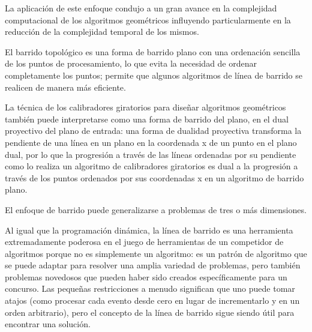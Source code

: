 La aplicación de este enfoque condujo a un gran avance en la complejidad computacional de los algoritmos geométricos influyendo particularmente en la reducción de la complejidad temporal de los mismos.

El barrido topológico es una forma de barrido plano con una ordenación sencilla de los puntos de procesamiento, lo que evita la necesidad de ordenar completamente los puntos; permite que algunos algoritmos de línea de barrido se realicen de manera más eficiente.

La técnica de los calibradores giratorios para diseñar algoritmos geométricos también puede interpretarse como una forma de barrido del plano, en el dual proyectivo del plano de entrada: una forma de dualidad proyectiva transforma la pendiente de una línea en un plano en la coordenada x de un punto en el plano dual, por lo que la progresión a través de las líneas ordenadas por su pendiente como lo realiza un algoritmo de calibradores giratorios es dual a la progresión a través de los puntos ordenados por sus coordenadas x en un algoritmo de barrido plano.

El enfoque de barrido puede generalizarse a problemas de tres o más dimensiones.

Al igual que la programación dinámica, la línea de barrido es una herramienta extremadamente poderosa en el juego de herramientas de un competidor de algoritmos porque no es simplemente un algoritmo: es un patrón de algoritmo que se puede adaptar para resolver una amplia variedad de problemas, pero también problemas novedosos que pueden haber sido creados específicamente para un concurso. Las pequeñas restricciones a menudo significan que uno puede tomar atajos (como procesar cada evento desde cero en lugar de incrementarlo y en un orden arbitrario), pero el concepto de la línea de barrido sigue siendo útil para encontrar una solución.